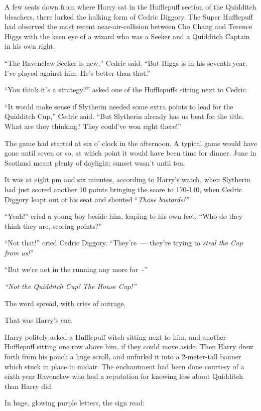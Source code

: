 A few seats down from where Harry sat in the Hufflepuff section of the Quidditch bleachers, there lurked the hulking form of Cedric Diggory. The Super Hufflepuff had observed the most recent near-air-collision between Cho Chang and Terence Higgs with the keen eye of a wizard who was a Seeker and a Quidditch Captain in his own right.

``The Ravenclaw Seeker is new,'' Cedric said. ``But Higgs is in his seventh year. I've played against him. He's better than that.''

``You think it's a strategy?'' asked one of the Hufflepuffs sitting next to Cedric.

``It would make sense if Slytherin needed some extra points to lead for the Quidditch Cup,'' Cedric said. ``But Slytherin already has us beat for the title. What are they thinking? They could've won right there!''

The game had started at six o' clock in the afternoon. A typical game would have gone until seven or so, at which point it would have been time for dinner. June in Scotland meant plenty of daylight; sunset wasn't until ten.

It was at eight pm and six minutes, according to Harry's watch, when Slytherin had just scored another 10 points bringing the score to 170-140, when Cedric Diggory leapt out of his seat and shouted ``\emph{Those bastards!''}

``Yeah!'' cried a young boy beside him, leaping to his own feet. ``Who do they think they are, scoring points?''

``Not that!'' cried Cedric Diggory. ``They're~--- they're trying to \emph{steal the Cup from us!}''

``But we're not in the running any more for~-''

\emph{``Not the Quidditch Cup! The House Cup!''}

The word spread, with cries of outrage.

That was Harry's cue.

Harry politely asked a Hufflepuff witch sitting next to him, and another Hufflepuff sitting one row above him, if they could move aside. Then Harry drew forth from his pouch a huge scroll, and unfurled it into a 2-meter-tall banner which stuck in place in midair. The enchantment had been done courtesy of a sixth-year Ravenclaw who had a reputation for knowing less about Quidditch than Harry did.

In huge, glowing purple letters, the sign read:

